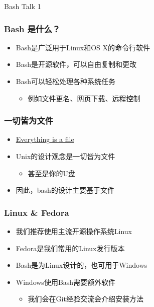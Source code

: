 


\begin{CJK}{UTF8}{gbsn}

\PreFirstFrame
\begin{frame} [fragile]
	\centerline{\fontsize{42}{42}\selectfont Bash Talk 1}
\end{frame}
\PostFirstFrame

\begin{frame}
	\frametitle{Bash 是什么？}
	\linespread{2}
	\begin{itemize}
	\item Bash是广泛用于Linux和OS X的命令行软件
	\item Bash是开源软件，可以自由复制和更改
	\item Bash可以轻松处理各种系统任务
		\begin{itemize}
		\item 例如文件更名、网页下载、远程控制
		\end{itemize}
	\end{itemize}
\end{frame}

\begin{frame} [fragile]
	\frametitle{一切皆为文件}
	\linespread{2}
	\begin{itemize}
	\item \href{https://en.wikipedia.org/wiki/Everything\_is\_a\_file}
				{Everything is a file}
	\item Unix的设计观念是一切皆为文件
		\begin{itemize}
		\item 甚至是你的U盘
		\end{itemize}
	\item 因此，bash的设计主要基于文件
	\end{itemize}
\end{frame}

\begin{frame} [fragile]
	\frametitle{Linux \& Fedora}
	\linespread{2}
	\begin{itemize}
	\item 我们推荐使用主流开源操作系统Linux
	\item Fedora是我们常用的Linux发行版本
	\item Bash是为Linux设计的，也可用于Windows
	\item Windows使用Bash需要额外软件
		\begin{itemize}
		\item 我们会在Git经验交流会介绍安装方法
		\end{itemize}
	\end{itemize}
\end{frame}


\end{CJK}
